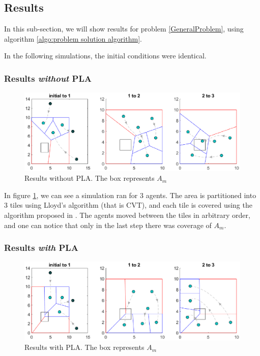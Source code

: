 \documentclass{iacas}
\begin{document}

\subsection{Results}
In this sub-section, we will show results for problem \ref{GeneralProblem}, using algorithm \ref{algo:problem solution algorithm}.

In the following simulations, the initial conditions were identical.

\subsubsection{Results \emph{without} PLA}
\begin{figure}[H]
\includegraphics[scale=0.8]{figures/proposed-sol/results/sim1-3agents-3partitions-noPLA.eps}
\caption{Results without PLA. The box represents $A_m$}
\label{fig:results no PLA}
\end{figure}

In figure \ref{fig:results no PLA}, we can see a simulation ran for 3 agents. The area is partitioned into 3 tiles using Lloyd's algorithm (that is CVT), and each tile is covered using the algorithm proposed in \cite{Cortes2004}. The agents moved between the tiles in arbitrary order, and one can notice that only in the last step there was coverage of $A_m$.

\subsubsection{Results \emph{with} PLA}
\begin{figure}[H]
\includegraphics[scale=0.8]{figures/proposed-sol/results/sim2-3agents-3partitions-PLA.eps}
\caption{Results with PLA. The box represents $A_m$}
\label{fig:results PLA}
\end{figure}
\end{document}
